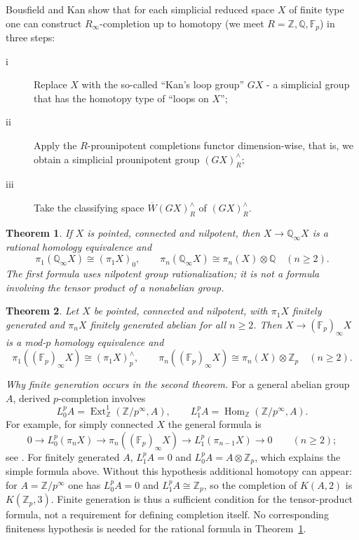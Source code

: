 \documentclass[11pt,a4paper]{article}
\newtheorem{theorem}{Theorem}[section] %
\begin{document}
Bousfield and Kan show \cite[Proposition 4.1]{BK} that for each simplicial reduced space $X$ of finite type one can construct $R_{\infty}$-completion up to homotopy (we meet $R=\mathbb{Z}, \mathbb{Q},\mathbb{F}_p$) in three steps:
\begin{description}
\item[i]{Replace $X$ with the so-called ``Kan's loop group'' $GX$ \cite[p.276]{GJ} - a simplicial group that has the homotopy type of ``loops on $X$'';}
\item[ii]{Apply the $R$-prounipotent completions functor dimension-wise, that is, we obtain a simplicial prounipotent group $(GX)^{\wedge}_R$;}
\item[iii]{Take the classifying space $\overline{W}(GX)^{\wedge}_R$ of $(GX)^{\wedge}_R$.}
\end{description}

\begin{theorem}\cite[Chapter~V, Section~3]{BK}\label{q}
If $X$ is pointed, connected and nilpotent, then
$X\to\mathbb Q_\infty X$ is a rational homology equivalence and
\[
 \pi_1(\mathbb Q_\infty X)\cong(\pi_1X)_0,\qquad
 \pi_n(\mathbb Q_\infty X)\cong\pi_n(X)\otimes\mathbb Q
 \quad(n\geq2).
\]
The first formula uses nilpotent group rationalization; it is not a
formula involving the tensor product of a nonabelian group.
\end{theorem}
\begin{theorem}\cite[Chapter~VI, Section~5]{BK}\label{p}
Let $X$ be pointed, connected and nilpotent, with $\pi_1X$ finitely
generated and $\pi_nX$ finitely generated abelian for all $n\geq2$.
Then $X\to(\mathbb F_p)_\infty X$ is a mod-$p$ homology equivalence and
\[
 \pi_1((\mathbb F_p)_\infty X)\cong(\pi_1X)_p^{\wedge},\qquad
 \pi_n((\mathbb F_p)_\infty X)\cong\pi_n(X)\otimes\mathbb Z_p
 \quad(n\geq2).
\]
\end{theorem}
\noindent\emph{Why finite generation occurs in the second theorem.}
For a general abelian group $A$, derived $p$-completion involves
\[
 L_0^pA=\operatorname{Ext}^1_{\mathbb Z}(\mathbb Z/p^{\infty},A),
 \qquad L_1^pA=\operatorname{Hom}_{\mathbb Z}(\mathbb Z/p^{\infty},A).
\]
For example, for simply connected $X$ the general formula is
\[
 0\longrightarrow L_0^p(\pi_nX)
 \longrightarrow\pi_n((\mathbb F_p)_\infty X)
 \longrightarrow L_1^p(\pi_{n-1}X)\longrightarrow0
 \qquad(n\geq2);
\]
see \cite[Chapter~VI, Proposition~5.1]{BK}.  For finitely generated $A$,
$L_1^pA=0$ and $L_0^pA=A\otimes\mathbb Z_p$, which explains the simple
formula above.  Without this hypothesis additional homotopy can appear:
for $A=\mathbb Z/p^{\infty}$ one has $L_0^pA=0$ and
$L_1^pA\cong\mathbb Z_p$, so the completion of $K(A,2)$ is
$K(\mathbb Z_p,3)$.  Finite generation is thus a sufficient condition
for the tensor-product formula, not a requirement for defining
completion itself.  No corresponding finiteness hypothesis is needed
for the rational formula in Theorem~\ref{q}.
\end{document}
